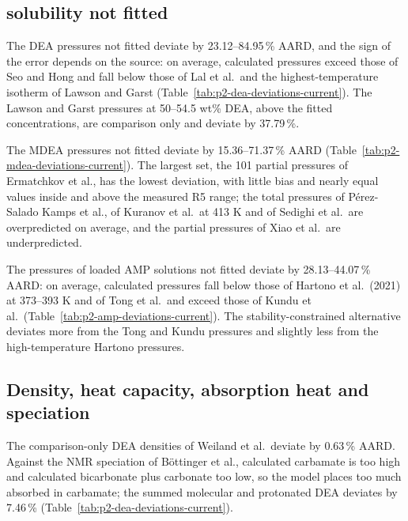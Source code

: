 \subsection{\texorpdfstring{\COtwo}{CO2} solubility not fitted}\label{sec:p2-results-not-fitted}
The DEA pressures not fitted deviate by 23.12--84.95\,\% AARD, and the sign of the error depends on the source: on average, calculated pressures exceed those of Seo and Hong and fall below those of Lal et al.\ and the highest-temperature isotherm of Lawson and Garst (Table~\ref{tab:p2-dea-deviations-current}).
The Lawson and Garst pressures at 50--54.5 wt\% DEA, above the fitted concentrations, are comparison only and deviate by 37.79\,\%.



The MDEA pressures not fitted deviate by 15.36--71.37\,\% AARD (Table~\ref{tab:p2-mdea-deviations-current}).
The largest set, the 101 \COtwo partial pressures of Ermatchkov et al., has the lowest deviation, with little bias and nearly equal values inside and above the measured R5 range; the total pressures of P\'erez-Salado Kamps et al., of Kuranov et al.\ at 413 K and of Sedighi et al.\ are overpredicted on average, and the partial pressures of Xiao et al.\ are underpredicted.



The pressures of loaded AMP solutions not fitted deviate by 28.13--44.07\,\% AARD: on average, calculated pressures fall below those of Hartono et al.\ (2021) at 373--393 K and of Tong et al.\ and exceed those of Kundu et al.\ (Table~\ref{tab:p2-amp-deviations-current}).
The stability-constrained alternative deviates more from the Tong and Kundu pressures and slightly less from the high-temperature Hartono pressures.



\subsection{Density, heat capacity, absorption heat and speciation}\label{sec:p2-results-species}
The comparison-only DEA densities of Weiland et al.\ deviate by 0.63\,\% AARD.
Against the NMR speciation of B\"ottinger et al., calculated carbamate is too high and calculated bicarbonate plus carbonate too low, so the model places too much absorbed \COtwo in carbamate; the summed molecular and protonated DEA deviates by 7.46\,\% (Table~\ref{tab:p2-dea-deviations-current}).

